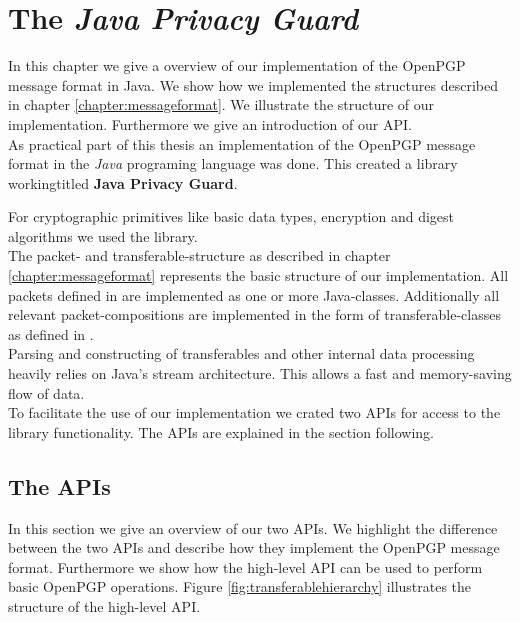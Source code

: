 \chapter{The \textit{Java Privacy Guard}} \label{chapter:jpg}

In this chapter we give a overview of our implementation of the OpenPGP message format in Java. We show how we implemented the structures described in chapter \ref{chapter:messageformat}. We illustrate the structure of our implementation. Furthermore we give an introduction of our API. \\


As practical part of this thesis an implementation of the OpenPGP message format \cite{RFC4880} in the \textit{Java} programing language was done. This created a library workingtitled \textbf{Java Privacy Guard}.

For cryptographic primitives like basic data types, encryption and digest algorithms we used the  library. \\

The packet- and transferable-structure as described in chapter \ref{chapter:messageformat} represents the basic structure of our implementation. All packets defined in \cite[section 5]{RFC4880} are implemented as one or more Java-classes. Additionally all relevant packet-compositions are implemented in the form of transferable-classes as defined in \cite[section 11]{RFC4880}. \\

Parsing and constructing of transferables and other internal data processing heavily relies on Java's stream architecture. This allows a fast and memory-saving flow of data. \\

To facilitate the use of our implementation we crated two APIs for access to the library functionality. The APIs are explained in the section following.

\section{The APIs}

In this section we give an overview of our two APIs. We highlight the difference between the two APIs and describe how they implement the OpenPGP message format. Furthermore we show how the high-level API can be used to perform basic OpenPGP operations. Figure \ref{fig:transferablehierarchy} illustrates the structure of the high-level API. \\

